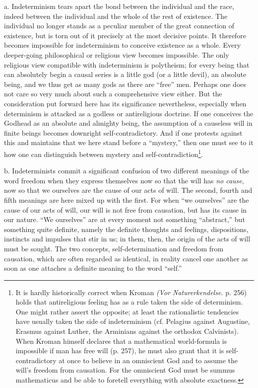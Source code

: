 \documentclass[12pt,a4paper,openany]{book}
\newcommand{\opage}[1]{\marginnote{\footnotesize\textit{[#1]}}}
\begin{document}
a. Indeterminism tears apart the bond between the individual and the race, indeed between the
individual and the whole of the rest of existence. The individual no longer stands as a peculiar member
of the great connection of existence, but is torn out of it precisely at the most decisive points. It
therefore becomes impossible for indeterminism to conceive existence as a whole. Every deeper-going
philosophical or religious view becomes impossible. The only religious view compatible with indeterminism
is polytheism; for every being that can absolutely begin a causal series is a little god (or a little
devil), an absolute being, and we thus get as many gods as there are ``free'' men. Perhaps one does not
care so very much about such a comprehensive view either. But the consideration put forward here has its
significance nevertheless, especially when determinism is attacked as a godless or antireligious
doctrine.
\opage{113}If one conceives the Godhead as an absolute and almighty being, the assumption of a causeless will in
finite beings becomes downright self-contradictory. And if one protests against this and maintains that
we here stand before a ``mystery,'' then one must see to it how one can distinguish between mystery and
self-contradiction\footnote[1]{It is hardly historically correct when Kroman \textit{(Vor
Naturerkendelse.} p. 256) holds that antireligious feeling has as a rule taken the side of determinism.
One might rather assert the opposite; at least the rationalistic tendencies have usually taken the side
of indeterminism (cf. Pelagius against Augustine, Erasmus against Luther, the Arminians against the
orthodox Calvinists). When Kroman himself declares that a mathematical world-formula is impossible if man
has free will (p. 257), he must also grant that it is self-contradictory at once to believe in an
omniscient God and to assume the will's freedom from causation. For the omniscient God must be summus
mathematicus and be able to foretell everything with absolute exactness.}.

b. Indeterminists commit a significant confusion of two different meanings of the word freedom when they
express themselves now so that the will has \textit{no cause}, now so that we ourselves are the cause of
our acts of will. The second, fourth and fifth meanings are here mixed up with the first. For when ``we
ourselves'' are the cause of our acts of will, our will is not free from causation, but has its cause in
our nature. ``We ourselves'' are at every moment not something ``abstract,'' but something quite
definite, namely the definite thoughts and feelings, dispositions, instincts and impulses that stir in us;
in them, then, the origin of the acts of will must be sought. The two concepts, self-determination and
freedom from causation, which are often regarded as identical, in reality cancel one another as soon as
one attaches a definite meaning to the word ``self.''
\end{document}
